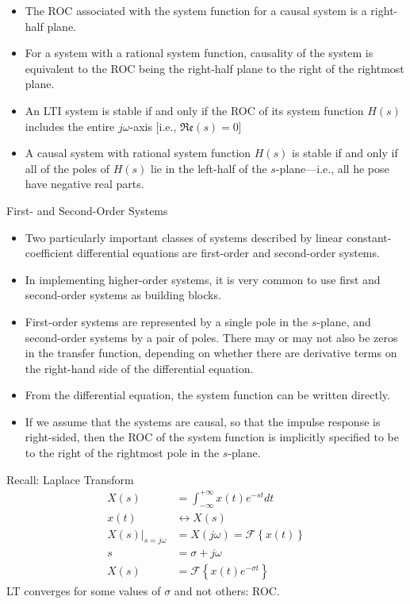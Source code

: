 \begin{frame}
    \begin{itemize}[<+->]
        \item The ROC associated with the system function for a \alert{causal} system is a right-half plane.
        \item For a system with a rational system function, causality of the system is equivalent to the ROC being the right-half plane to the right of the rightmost plane.
        \item An LTI system is stable if and only if the ROC of its system function $H(s)$ includes the entire $j\omega$-axis [i.e., $\mathfrak{Re}(s) = 0$]
        \item A causal system with rational system function $H(s)$ is stable if and only if all of the poles of $H(s)$ lie in the left-half of the $s$-plane---i.e., all he pose have negative real parts.
    \end{itemize}
\end{frame}

\begin{frame}{First- and Second-Order Systems}
    \begin{itemize}
        \item Two particularly important classes of systems described by linear constant-coefficient differential equations are first-order and second-order systems.
        \item In implementing higher-order systems, it is very common to use first and second-order systems as building blocks.
        \item First-order systems are represented by a single pole in the $s$-plane, and second-order systems by a pair of poles. There may or may not also be zeros in the transfer function, depending on whether there are derivative terms on the right-hand side of the differential equation.
        \item From the differential equation, the system function can be written directly.
        \item If we assume that the systems are causal, so that the impulse response is right-sided, then the ROC of the system function is implicitly specified to be to the right of the rightmost pole in the $s$-plane.
    \end{itemize}
\end{frame}

\begin{frame}{Recall: Laplace Transform}
    \begin{align*}
        X(s) &= \int_{-\infty}^{+\infty}x(t)e^{-st}dt\\
        x(t) &\leftrightarrow X(s)\\
        \left.X(s)\right|_{s=j\omega} &= X(j\omega) = \mathcal{F}\left\{ x(t)\right\}\\
        s &= \sigma + j\omega\\
         X(s) &= \mathcal{F}\left\{ x(t)e^{-\sigma t}\right\}
    \end{align*}
    LT converges for some values of $\sigma$ and not others: ROC.
\end{frame}



